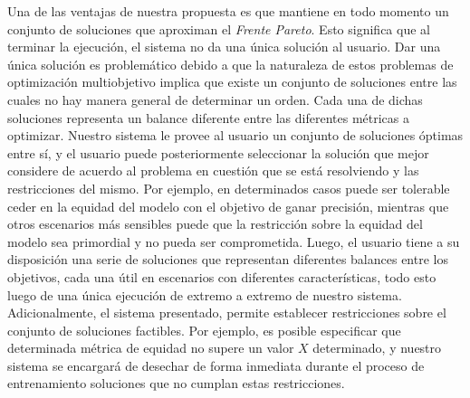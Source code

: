 Una de las ventajas de nuestra propuesta es que mantiene en todo momento un conjunto de soluciones que aproximan el \emph{Frente Pareto}.
Esto significa que al terminar la ejecución, el sistema no da una única solución al usuario.
Dar una única solución es problemático debido a que la naturaleza de estos problemas de optimización multiobjetivo implica que existe un conjunto de soluciones entre las cuales no hay manera general de determinar un orden.
Cada una de dichas soluciones representa un balance diferente entre las diferentes métricas a optimizar.
Nuestro sistema le provee al usuario un conjunto de soluciones óptimas entre sí, y el usuario puede posteriormente seleccionar la solución que mejor considere de acuerdo al problema en cuestión que se está resolviendo y las restricciones del mismo.
Por ejemplo, en determinados casos puede ser tolerable ceder en la equidad del modelo con el objetivo de ganar precisión, mientras que otros escenarios más sensibles puede que la restricción sobre la equidad del modelo sea primordial y no pueda ser comprometida.
Luego, el usuario tiene a su disposición una serie de soluciones que representan diferentes balances entre los objetivos, cada una útil en escenarios con diferentes características, todo esto luego de una única ejecución de extremo a extremo de nuestro sistema.
Adicionalmente, el sistema presentado, permite establecer restricciones sobre el conjunto de soluciones factibles.
Por ejemplo, es posible especificar que determinada métrica de equidad no supere un valor $X$ determinado, y nuestro sistema se encargará de desechar de forma inmediata durante el proceso de entrenamiento soluciones que no cumplan estas restricciones.
